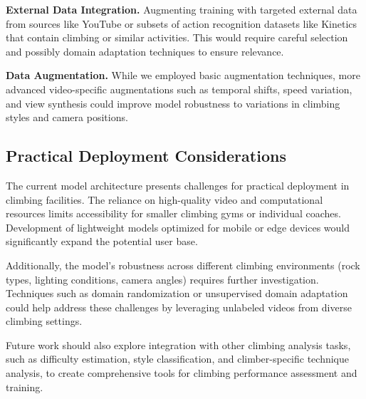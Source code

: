 \noindent\textbf{External Data Integration.}
Augmenting training with targeted external data from sources like YouTube or subsets of action recognition datasets like Kinetics that contain climbing or similar activities. This would require careful selection and possibly domain adaptation techniques to ensure relevance.

\noindent\textbf{Data Augmentation.}
While we employed basic augmentation techniques, more advanced video-specific augmentations such as temporal shifts, speed variation, and view synthesis could improve model robustness to variations in climbing styles and camera positions.

\subsection*{Practical Deployment Considerations}
The current model architecture presents challenges for practical deployment in climbing facilities. The reliance on high-quality video and computational resources limits accessibility for smaller climbing gyms or individual coaches. Development of lightweight models optimized for mobile or edge devices would significantly expand the potential user base.

Additionally, the model's robustness across different climbing environments (rock types, lighting conditions, camera angles) requires further investigation. Techniques such as domain randomization or unsupervised domain adaptation could help address these challenges by leveraging unlabeled videos from diverse climbing settings.

Future work should also explore integration with other climbing analysis tasks, such as difficulty estimation, style classification, and climber-specific technique analysis, to create comprehensive tools for climbing performance assessment and training.